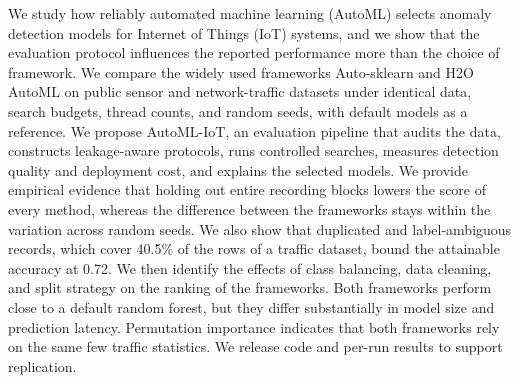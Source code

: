 We study how reliably automated machine learning (AutoML) selects anomaly detection models for Internet of Things (IoT) systems, and we show that the evaluation protocol influences the reported performance more than the choice of framework. We compare the widely used frameworks Auto-sklearn and H2O AutoML on public sensor and network-traffic datasets under identical data, search budgets, thread counts, and random seeds, with default models as a reference. We propose AutoML-IoT, an evaluation pipeline that audits the data, constructs leakage-aware protocols, runs controlled searches, measures detection quality and deployment cost, and explains the selected models. We provide empirical evidence that holding out entire recording blocks lowers the score of every method, whereas the difference between the frameworks stays within the variation across random seeds. We also show that duplicated and label-ambiguous records, which cover 40.5\% of the rows of a traffic dataset, bound the attainable accuracy at 0.72. We then identify the effects of class balancing, data cleaning, and split strategy on the ranking of the frameworks. Both frameworks perform close to a default random forest, but they differ substantially in model size and prediction latency. Permutation importance indicates that both frameworks rely on the same few traffic statistics. We release code and per-run results to support replication.
